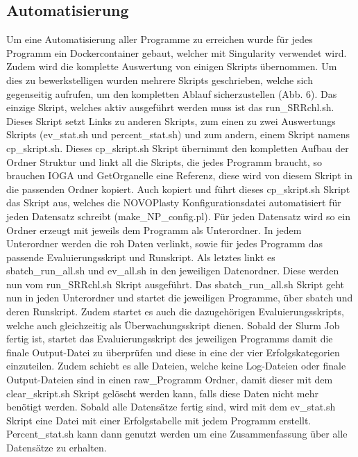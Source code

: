 \documentclass{scrartcl}
\begin{document}
\subsection{Automatisierung}
\label{sec-4-1}
Um eine Automatisierung aller Programme zu erreichen wurde für jedes Programm ein Dockercontainer gebaut, welcher mit Singularity verwendet wird. Zudem wird die komplette Auswertung von einigen Skripts 
übernommen. Um dies zu bewerkstelligen wurden mehrere Skripts geschrieben, welche sich gegenseitig aufrufen, um den kompletten Ablauf sicherzustellen (Abb. 6). 
Das einzige Skript, welches aktiv ausgeführt werden muss ist das run\_SRRchl.sh. Dieses Skript setzt Links zu anderen Skripts, zum einen zu zwei Auswertungs Skripts (ev\_stat.sh und percent\_stat.sh) und
zum andern, einem Skript namens cp\_skript.sh. Dieses cp\_skript.sh Skript übernimmt den kompletten Aufbau der Ordner Struktur und linkt all die Skripts, die jedes Programm braucht, so brauchen IOGA und GetOrganelle
eine Referenz, diese wird von diesem Skript in die passenden Ordner kopiert. Auch kopiert und führt dieses cp\_skript.sh Skript das Skript aus, welches die NOVOPlasty Konfigurationsdatei automatisiert für jeden
Datensatz schreibt (make\_NP\_config.pl). Für jeden Datensatz wird so ein Ordner erzeugt mit jeweils dem Programm als Unterordner. In jedem Unterordner werden die roh Daten verlinkt, sowie für jedes Programm
das passende Evaluierungsskript und Runskript. Als letztes linkt es sbatch\_run\_all.sh und ev\_all.sh in den jeweiligen Datenordner. Diese werden nun vom run\_SRRchl.sh Skript ausgeführt. Das sbatch\_run\_all.sh
Skript geht nun in jeden Unterordner und startet die jeweiligen Programme, über sbatch und deren Runskript. Zudem startet es auch die dazugehörigen Evaluierungsskripts, welche auch gleichzeitig als Überwachungsskript 
dienen. Sobald der Slurm Job fertig ist, startet das Evaluierungsskript des jeweiligen Programms damit die finale Output-Datei zu überprüfen und diese in eine der vier Erfolgskategorien einzuteilen. Zudem
schiebt es alle Dateien, welche keine Log-Dateien oder finale Output-Dateien sind in einen raw\_Programm Ordner, damit dieser mit dem clear\_skript.sh Skript gelöscht werden kann, falls diese Daten nicht mehr benötigt werden.
Sobald alle Datensätze fertig sind, wird mit dem ev\_stat.sh Skript eine Datei mit einer Erfolgstabelle mit jedem Programm erstellt. Percent\_stat.sh kann dann genutzt werden um eine Zusammenfassung über alle Datensätze 
zu erhalten.
\end{document}
